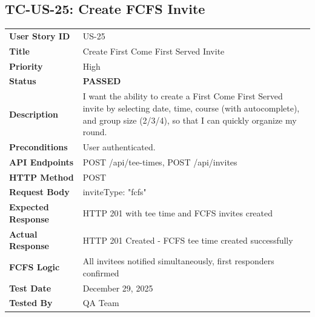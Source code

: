 \documentclass[11pt,a4paper]{article}
\newcommand{\passed}{\textcolor{pass}{\textbf{PASSED}}}
\begin{document}
\vspace{0.5cm}


\subsection{TC-US-25: Create FCFS Invite}

\begin{tabularx}{\textwidth}{|p{3.2cm}|Y|}
\hline
{}
 \\
\hline
\textbf{User Story ID} & US-25 \\
\hline
\textbf{Title} & Create First Come First Served Invite \\
\hline
\textbf{Priority} & High \\
\hline
\textbf{Status} & \passed \\
\hline
\textbf{Description} & I want the ability to create a First Come First Served invite by selecting date, time, course (with autocomplete), and group size (2/3/4), so that I can quickly organize my round. \\
\hline
\textbf{Preconditions} & User authenticated. \\
\hline
\textbf{API Endpoints} & POST /api/tee-times, POST /api/invites \\
\hline
\textbf{HTTP Method} & POST \\
\hline
\textbf{Request Body} & inviteType: "fcfs" \\
\hline
\textbf{Expected Response} & HTTP 201 with tee time and FCFS invites created \\
\hline
\textbf{Actual Response} & HTTP 201 Created - FCFS tee time created successfully \\
\hline
\textbf{FCFS Logic} & All invitees notified simultaneously, first responders confirmed \\
\hline
\textbf{Test Date} & December 29, 2025 \\
\hline
\textbf{Tested By} & QA Team \\
\hline
\end{tabularx}
\end{document}
